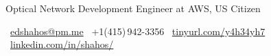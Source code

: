 \vspace{-0.3cm}

\par{\par}
\begin{center}
    {\fontinbf Optical Network Development Engineer at AWS, US Citizen}
\end{center}
\vspace{-0.2cm}
\begin{center}
\small
\contacticon{\faEnvelope[regular]}\ \href{mailto:edshahos@pm.me}{edshahos@pm.me}\quad
\contacticon{\faPhone*}\ +1(415)\,942-3356\quad
\contacticon{\faGraduationCap}\ \href{https://scholar.google.com/citations?sortby=pubdate&hl=en&user=i6EaMioAAAAJ&view_op=list_works/}{tinyurl.com/y4h34yh7}\quad
\contacticon{\faLinkedinIn}\ \href{https://www.linkedin.com/in/shahos/}{linkedin.com/in/shahos/}
\end{center}
\vspace{-0.3cm}
